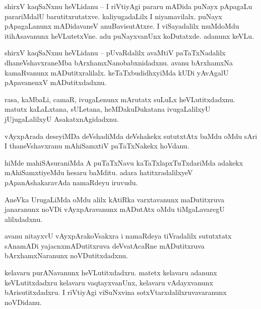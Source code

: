 \documentclass{article}
\begin{document}
\begin{mn}%
shirxV kaqSaNxnu heVLidanu -- I riVtiyAgi pararu mADida puNayx pApagaLu parariMdalU 
barutitxrutatxve. kaliyugadaLilx I niyamavilalx. puNayx pApagaLanunx mADidavaneV anuBavisutAtxre. 
I viSayadalilx muMdoMdu itihAsavanunx heVLutetxVne. adu puNayxvanUnx koDutatxde. adanunx keVLu.
\end{mn}


\begin{mn}%
shirxV kaqSaNxnu heVLidanu -- pUvaRdalilx avaMtiV paTaTxNadalilx dhaneVshavxraneMba 
bArxhamxNanobabxnidadxnu. avanu bArxhamxNa kamaRvanunx mADutitxralilalx. keTaTxbudidhxyiMda kUDi 
yAvAgalU pApavanenxV mADutitxdadxnu.
\end{mn}

\begin{mn}%
rasa, kaMbaLi, camaR, ivugaLenunx mArutatx suLuLx heVLutitxdadxnu. matutx kaLaLxtana, sULetana, 
heMDakuDukatana ivugaLalilxyU jUjugaLalilxyU AsakatxnAgidadxnu.
\end{mn}

\begin{mn}%
vAyxpArada deseyiMDa deVshadiMda deVshakekx sututxtAtx baMdu oMdu sAri I thaneVshavxranu 
mAhiSamxtiV paTaTxNakekx hoVdanu.
\end{mn}

\begin{mn}%
hiMde mahiSAsuraniMda A puTaTxNavu kaTaTxlapxTuTxdariMda adakekx mAhiSamxtiyeMdu hesaru baMditu. 
adara hatitxradalilxyeV pApanAshakaravAda namaRdeyu iruvudu.
\end{mn}

\begin{mn}%
AneVka UrugaLiMda oMdu alilx kAtiRka varxtavanunx maDutitxruva janaranunx noVDi vAyxpAravanunx 
mADutAtx oMdu tiMgaLavaregU alilxdadxnu.
\end{mn}

\begin{mn}%
avanu nitayxvU vAyxpArakoVsakxra i namaRdeya tiVradalilx sututxtatx sAnamADi yajacnxmADutitxruva 
deVvatAcaRne mADutitxruva bArxhamxNaranunx noVDutitxdadxnu.
\end{mn}

\begin{mn}%
kelavaru purANavanunx heVLutitxdadxru. matetx kelavaru adanunx keVLutitxdadxru kelavaru 
vaqtayxvanUnx, kelavaru vAdayxvanunx bArisutitxdadxru. I riVtiyAgi viSuNxvina 
sotxVtarxdalilxruvavaranunx noVDidanu.
\end{mn}
\end{document}
